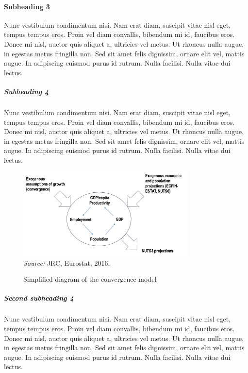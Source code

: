 \documentclass[10pt,a4paper]{article}
\begin{document}
\paragraph{Subheading 3}
Nunc vestibulum condimentum nisi. Nam erat diam, suscipit vitae nisl eget, tempus tempus eros. Proin vel diam convallis, bibendum mi id, faucibus eros. Donec mi nisl, auctor quis aliquet a, ultricies vel metus. Ut rhoncus nulla augue, in egestas metus fringilla non. Sed sit amet felis dignissim, ornare elit vel, mattis augue. In adipiscing euismod purus id rutrum. Nulla facilisi. Nulla vitae dui lectus.

\subparagraph{Subheading 4}
Nunc vestibulum condimentum nisi. Nam erat diam, suscipit vitae nisl eget, tempus tempus eros. Proin vel diam convallis, bibendum mi id, faucibus eros. Donec mi nisl, auctor quis aliquet a, ultricies vel metus. Ut rhoncus nulla augue, in egestas metus fringilla non. Sed sit amet felis dignissim, ornare elit vel, mattis augue. In adipiscing euismod purus id rutrum. Nulla facilisi. Nulla vitae dui lectus.

\begin{figure}[!h]
	\centering
		\caption{Simplified diagram of the convergence model}
		\includegraphics[width=0.80\textwidth]{figure.png}
	~\\ \textit{Source:} JRC, Eurostat, 2016.
	\label{fig:figure}
\end{figure}

\subparagraph{Second subheading 4}
Nunc vestibulum condimentum nisi. Nam erat diam, suscipit vitae nisl eget, tempus tempus eros. Proin vel diam convallis, bibendum mi id, faucibus eros. Donec mi nisl, auctor quis aliquet a, ultricies vel metus. Ut rhoncus nulla augue, in egestas metus fringilla non. Sed sit amet felis dignissim, ornare elit vel, mattis augue. In adipiscing euismod purus id rutrum. Nulla facilisi. Nulla vitae dui lectus.
~\\
\begin{center}

\end{center}
\newpage
\end{document}
